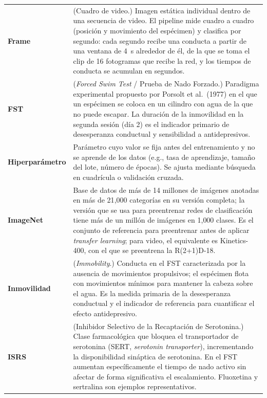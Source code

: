 \begin{longtable}{@{} p{4.0cm} p{10.9cm} @{}}
  \textbf{Frame}
  & (Cuadro de video.) Imagen estática individual dentro de una secuencia de
    video. El pipeline mide cuadro a cuadro (posición y movimiento del espécimen) y
    clasifica por segundo: cada segundo recibe una conducta a partir de una ventana
    de 4~s alrededor de él, de la que se toma el clip de 16 fotogramas que recibe la
    red, y los tiempos de conducta se acumulan en segundos. \\[5pt]

  \textbf{FST}
  & (\textit{Forced Swim Test} / Prueba de Nado Forzado.) Paradigma experimental
    propuesto por Porsolt et al.\ (1977) en el que un espécimen se coloca en un
    cilindro con agua de la que no puede escapar. La duración de la inmovilidad
    en la segunda sesión (día 2) es el indicador primario de desesperanza
    conductual y sensibilidad a antidepresivos. \\[5pt]

  \textbf{Hiperparámetro}
  & Parámetro cuyo valor se fija antes del entrenamiento y no se aprende de los
    datos (e.g., tasa de aprendizaje, tamaño del lote, número de épocas). Se ajusta mediante búsqueda en
    cuadrícula o validación cruzada. \\[5pt]

  \textbf{ImageNet}
  & Base de datos de más de 14 millones de imágenes anotadas en más de 21{,}000
    categorías en su versión completa; la versión que se usa para preentrenar redes
    de clasificación tiene más de un millón de imágenes en 1{,}000 clases. Es el
    conjunto de referencia para preentrenar antes de aplicar \textit{transfer
    learning}; para video, el equivalente es Kinetics-400, con el que se preentrena
    la R(2+1)D-18. \\[5pt]

  \textbf{Inmovilidad}
  & (\textit{Immobility}.) Conducta en el FST caracterizada por la ausencia de
    movimientos propulsivos; el espécimen flota con movimientos mínimos para
    mantener la cabeza sobre el agua. Es la medida primaria de la desesperanza
    conductual y el indicador de referencia para cuantificar el efecto
    antidepresivo. \\[5pt]


  \textbf{ISRS}
  & (Inhibidor Selectivo de la Recaptación de Serotonina.) Clase farmacológica
    que bloquea el transportador de serotonina (SERT, \textit{serotonin transporter}), incrementando la disponibilidad sináptica
    de serotonina. En el FST aumentan específicamente el tiempo de nado activo
    sin afectar de forma significativa el escalamiento. Fluoxetina y sertralina
    son ejemplos representativos. \\[5pt]


\end{longtable}
